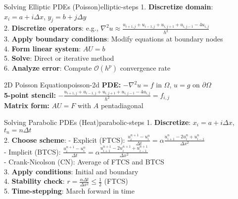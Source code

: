 \documentclass[10pt,a4paper,landscape]{article}
\begin{document}
\begin{multicols}{3}
\begin{codebox}{Solving Elliptic PDEs (Poisson)}{elliptic-steps}
1. \textbf{Discretize domain}: $x_i = a + i\Delta x$, $y_j = b + j\Delta y$ \\
2. \textbf{Discretize operators}: e.g., $\nabla^2 u \approx \frac{u_{i+1,j} + u_{i-1,j} + u_{i,j+1} + u_{i,j-1} - 4u_{i,j}}{h^2}$ \\
3. \textbf{Apply boundary conditions}: Modify equations at boundary nodes \\
4. \textbf{Form linear system}: $AU = b$ \\
5. \textbf{Solve}: Direct or iterative method \\
6. \textbf{Analyze error}: Compute $\mathcal{O}(h^p)$ convergence rate
\end{codebox}

\begin{formulabox}{2D Poisson Equation}{poisson-2d}
\textbf{PDE:} $-\nabla^2 u = f$ in $\Omega$, $u = g$ on $\partial\Omega$ \\[0.5em]
\textbf{5-point stencil:} 
$-\frac{u_{i+1,j} + u_{i-1,j} + u_{i,j+1} + u_{i,j-1} - 4u_{i,j}}{h^2} = f_{i,j}$ \\[0.5em]
\textbf{Matrix form:} $AU = F$ with $A$ pentadiagonal
\end{formulabox}

\begin{center}
\small
{}
\end{center}

\begin{codebox}{Solving Parabolic PDEs (Heat)}{parabolic-steps}
1. \textbf{Discretize}: $x_i = a + i\Delta x$, $t_n = n\Delta t$ \\
2. \textbf{Choose scheme}: 
   - Explicit (FTCS): $\frac{u_i^{n+1} - u_i^n}{\Delta t} = \alpha \frac{u_{i+1}^n - 2u_i^n + u_{i-1}^n}{\Delta x^2}$ \\
   - Implicit (BTCS): $\frac{u_i^{n+1} - u_i^n}{\Delta t} = \alpha \frac{u_{i+1}^{n+1} - 2u_i^{n+1} + u_{i-1}^{n+1}}{\Delta x^2}$ \\
   - Crank-Nicolson (CN): Average of FTCS and BTCS \\
3. \textbf{Apply conditions}: Initial and boundary \\
4. \textbf{Stability check}: $r = \frac{\alpha \Delta t}{\Delta x^2} \leq \frac{1}{2}$ (FTCS) \\
5. \textbf{Time-stepping}: March forward in time
\end{codebox}


\end{multicols}
\end{document}
